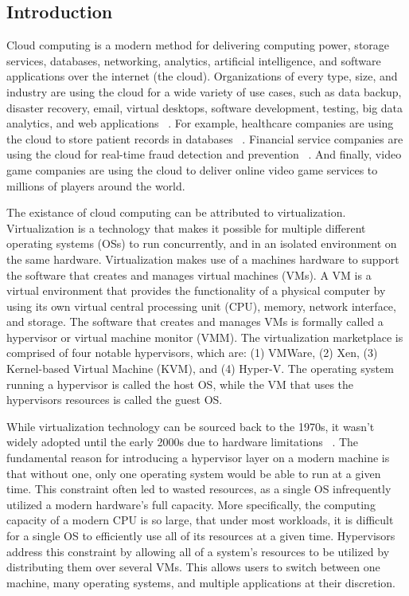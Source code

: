 \documentclass{report}
\begin{document}
\begin{spacing}{1.5}


\newpage
\chapter{Introduction}


{\large
Cloud computing is a modern method for delivering computing power, storage services, databases, networking, analytics, artificial intelligence, and software applications over the internet (the cloud). Organizations of every type, size, and industry are using the cloud for a wide variety of use cases, such as data backup, disaster recovery, email, virtual desktops, software development, testing, big data analytics, and web applications ~\cite{BELLO2021103441}. For example, healthcare companies are using the cloud to store patient records in databases ~\cite{BELLO2021103441}. Financial service companies are using the cloud for real-time fraud detection and prevention ~\cite{BELLO2021103441}. And finally, video game companies are using the cloud to deliver online video game services to millions of players around the world.
\newline
}

{\large
The existance of cloud computing can be attributed to virtualization. Virtualization is a technology that makes it possible for multiple different operating systems (OSs) to run concurrently, and in an isolated environment on the same hardware. Virtualization makes use of a machines hardware to support the software that creates and manages virtual machines (VMs). A VM is a virtual environment that provides the functionality of a physical computer by using its own virtual central processing unit (CPU), memory, network interface, and storage. The software that creates and manages VMs is formally called a hypervisor or virtual machine monitor (VMM). The virtualization marketplace is comprised of four notable hypervisors, which are: (1) VMWare, (2) Xen, (3) Kernel-based Virtual Machine (KVM), and (4) Hyper-V. The operating system running a hypervisor is called the host OS, while the VM that uses the hypervisors resources is called the guest OS.
\newline
}

{\large
While virtualization technology can be sourced back to the 1970s, it wasn’t widely adopted until the early 2000s due to hardware limitations ~\cite{popek1974formal}. The fundamental reason for introducing a hypervisor layer on a modern machine is that without one, only one operating system would be able to run at a given time. This constraint often led to wasted resources, as a single OS infrequently utilized a modern hardware’s full capacity. More specifically, the computing capacity of a modern CPU is so large, that under most workloads, it is difficult for a single OS to efficiently use all of its resources at a given time. Hypervisors address this constraint by allowing all of a system’s resources to be utilized by distributing them over several VMs. This allows users to switch between one machine, many operating systems, and multiple applications at their discretion.
\newline
}




\end{spacing}
\end{document}
